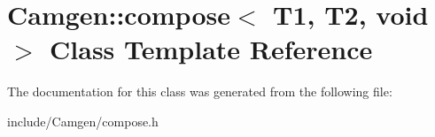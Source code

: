 \hypertarget{a00091}{}\section{Camgen\+:\+:compose$<$ T1, T2, void $>$ Class Template Reference}
\label{a00091}


The documentation for this class was generated from the following file\+:\begin{DoxyCompactItemize}
\item 
include/\+Camgen/compose.\+h\end{DoxyCompactItemize}

